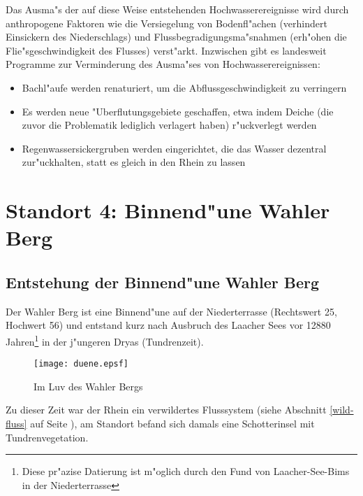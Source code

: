 \documentclass[titlepage,a4paper]{article}
\begin{document}
        Das Ausma"s der auf diese Weise entstehenden Hochwasserereignisse wird durch anthropogene Faktoren wie die Versiegelung von Bodenfl"achen (verhindert Einsickern des Niederschlags) und Flussbegradigungsma"snahmen (erh"ohen die Flie"sgeschwindigkeit des Flusses) verst"arkt. Inzwischen gibt es landesweit Programme zur Verminderung des Ausma"ses von Hochwasserereignissen:
        \begin{itemize} 
        \item Bachl"aufe werden renaturiert, um die Abflussgeschwindigkeit zu verringern
        \item Es werden neue "Uberflutungsgebiete geschaffen, etwa indem Deiche (die zuvor die Problematik lediglich verlagert haben) r"uckverlegt werden
        \item Regenwassersickergruben werden eingerichtet, die das Wasser dezentral zur"uckhalten, statt es gleich in den Rhein zu lassen
        \end{itemize}
\section{Standort 4: Binnend"une Wahler Berg}
    \subsection{Entstehung der Binnend"une Wahler Berg}
        Der Wahler Berg ist eine Binnend"une auf der Niederterrasse (Rechtswert 25, Hochwert 56) und entstand kurz nach Ausbruch des Laacher Sees vor 12880 Jahren\footnote{Diese pr"azise Datierung ist m"oglich durch den Fund von Laacher-See-Bims in der Niederterrasse} in der j"ungeren Dryas (Tundrenzeit). 
        \begin{figure}
\begin{center}
\texttt{[image: duene.epsf]}
\end{center}
\caption{Im Luv des Wahler Bergs} \label{duene}
\end{figure}
        Zu dieser Zeit war der Rhein ein verwildertes Flusssystem (siehe Abschnitt \ref{wild-fluss} auf Seite \pageref{wild-fluss}), am Standort befand sich damals eine Schotterinsel mit Tundrenvegetation. 
        
\end{document}
